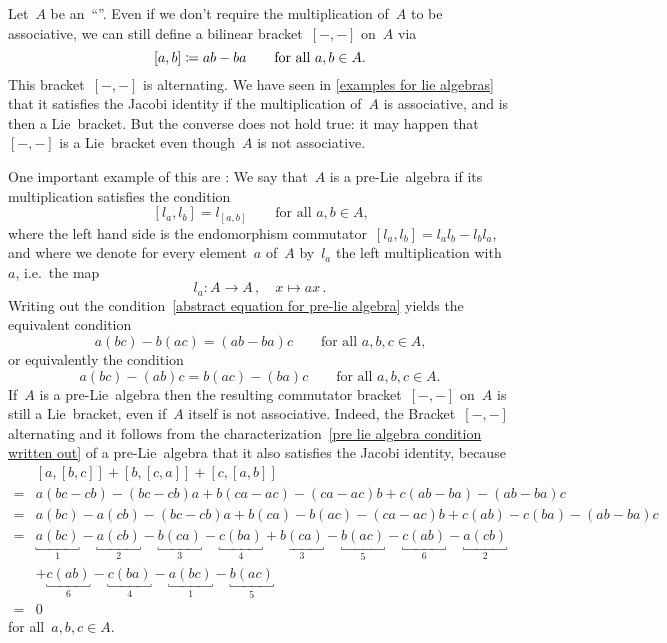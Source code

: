 \begin{remark}
  Let~$A$ be an~\enquote{\algebra{$\kf$}}.
  Even if we don’t require the multiplication of~$A$ to be associative, we can still define a bilinear bracket~$[-,-]$ on~$A$ via
  \[
    [a,b]
    \coloneqq
    ab-ba
    \qquad
    \text{for all~$a, b \in A$.}
  \]
  This bracket~$[-,-]$ is alternating.
  We have seen in \cref{examples for lie algebras} that it satisfies the Jacobi identity if the multiplication of~$A$ is associative, and is then a Lie~bracket.
  But the converse does not hold true:
  it may happen that~$[-,-]$ is a Lie~bracket even though~$A$ is not associative.
  
  One important example of this are :
  We say that~$A$ is a pre-Lie~algebra if its multiplication satisfies the condition
  \begin{equation}
    \label{abstract equation for pre-lie algebra}
    [l_a, l_b]
    =
    l_{[a,b]}
    \qquad
    \text{for all~$a, b \in A$,}
  \end{equation}
  where the left hand side is the endomorphism commutator~$[l_a, l_b] = l_a l_b - l_b l_a$, and where we denote for every element~$a$ of~$A$ by~$l_a$ the left multiplication with~$a$, i.e.\ the map
  \[
    l_a
    \colon
    A
    \to
    A \,,
    \quad
    x
    \mapsto
    ax \,.
  \]
  Writing out the condition~\eqref{abstract equation for pre-lie algebra} yields the equivalent condition
  \begin{equation}
    \label{pre lie algebra condition written out}
    a(bc) - b(ac)
    =
    (ab-ba)c
    \qquad
    \text{for all~$a, b, c \in A$,}
  \end{equation}
  or equivalently the condition
  \[
    a(bc) - (ab)c
    =
    b(ac) - (ba)c
    \qquad
    \text{for all~$a, b, c \in A$.}
  \]
  If~$A$ is a pre-Lie~algebra then the resulting commutator bracket~$[-,-]$ on~$A$ is still a Lie~bracket, even if~$A$ itself is not associative.
  Indeed, the Bracket~$[-,-]$ alternating and it follows from the characterization~\eqref{pre lie algebra condition written out} of a pre-Lie~algebra that it also satisfies the Jacobi identity, because
  \begin{align*}
    {}&
    [a, [b,c] ] + [b, [c, a]] + [c, [a, b]]
    \\
    ={}&
    a (bc - cb) - (bc - cb) a
    + b (ca - ac) - (ca - ac) b
    + c (ab - ba) - (ab - ba) c
    \\
    ={}&
    a (bc) - a (cb) - (bc - cb) a
    + b (ca) - b (ac) - (ca - ac) b
    + c (ab) - c (ba) - (ab - ba) c
    \\
    ={}&
    \underbracket{a (bc)}_{1}
    - \underbracket{a (cb)}_{2}
    - \underbracket{b (ca)}_{3}
    - \underbracket{c (ba)}_{4}
    + \underbracket{b (ca)}_{3}
    - \underbracket{b (ac)}_{5}
    - \underbracket{c (ab)}_{6}
    - \underbracket{a (cb)}_{2}
    \\
    {}&
    + \underbracket{c (ab)}_{6}
    - \underbracket{c (ba)}_{4}
    - \underbracket{a (bc)}_{1}
    - \underbracket{b (ac)}_{5}
    \\
    ={}&
    0
  \end{align*}
  for all~$a, b, c \in A$.


\end{remark}
